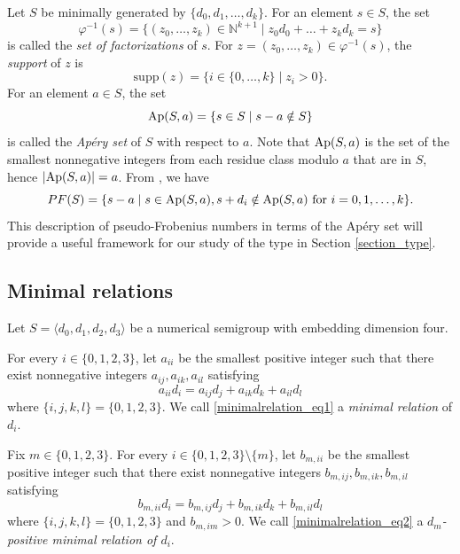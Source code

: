 \documentclass[12pt]{article}
\theoremstyle{remark}
\begin{document}
Let $S$ be minimally generated by $\{d_0,d_1,\dots,d_k\}$. For an element $s \in S$, the set
\begin{equation}
\varphi^{-1}(s) = \{(z_0,\dots,z_k)\in \mathbb{N}^{k+1} \mid z_0d_0 + \dots + z_kd_k = s\}
\end{equation}
is called the \emph{set of factorizations} of $s$.
For $z =(z_0,\dots,z_k) \in \varphi^{-1}(s)$, the \emph{support} of $z$ is 
\begin{equation}
\text{supp}(z) = \{i \in \{0,\dots,k\} \mid z_i > 0\}.
\end{equation}
For an element $a \in S$, the set
\begin{equation}
\textup{Ap}(S,a) = \{ s \in S \mid s-a \notin S\}
\end{equation}
is called the \emph{Ap{\'e}ry set} of $S$ with respect to $a$. Note that $\textup{Ap}(S,a)$ is the set of the smallest nonnegative integers from each residue class modulo $a$ that are in $S$, hence $ |\textup{Ap}(S,a)| = a$. From \cite[Proposition~2.20]{Rosales2009}, we have
\begin{equation}\label{eq_pseudo_frob}
     PF(S) = \{s - a \mid s \in \textup{Ap}(S,a), s + d_i \notin \textup{Ap}(S,a) \text{ for } i = 0,1,\dots,k\}.
\end{equation}
This description of pseudo-Frobenius numbers in terms of the Ap{\'e}ry set will provide a useful framework for our study of the type in Section \ref{section_type}.





\subsection{Minimal relations}\label{subsection_minimal_relations}

Let $S =\langle d_0,d_1,d_2,d_3 \rangle$ be a numerical semigroup with embedding dimension four.

For every $i \in \{0,1,2,3\}$, let $a_{ii}$ be the smallest positive integer such that there exist nonnegative integers $a_{ij},a_{ik},a_{il}$ satisfying
\begin{equation}\label{minimalrelation_eq1}
     a_{ii} d_i = a_{ij} d_j + a_{ik}d_k + a_{il} d_l
\end{equation}
where $\{i,j,k,l\} = \{0,1,2,3\}$. We call \eqref{minimalrelation_eq1} a \emph{minimal relation} of $d_i$.

Fix $m \in \{0,1,2,3\}$. For every $i \in \{0,1,2,3\} \setminus \{m\}$, let $b_{m,ii}$ be the smallest positive integer such that there exist nonnegative integers $b_{m,ij},b_{m,ik},b_{m,il}$ satisfying 
\begin{equation}\label{minimalrelation_eq2}
     b_{m,ii} d_i = b_{m,ij} d_j + b_{m,ik}d_k + b_{m,il} d_l
\end{equation}
where $\{i,j,k,l\} = \{0,1,2,3\}$ and $b_{m,im} > 0$. We call \eqref{minimalrelation_eq2} a \emph{$d_m$-positive minimal relation of $d_i$}.
\end{document}

